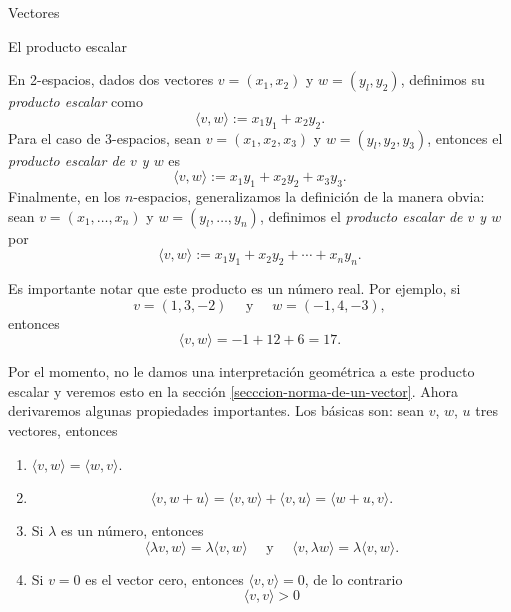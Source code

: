 \documentclass[a4paper,12pt,twoside,spanish]{amsbook}
\theoremstyle{definition}
\theoremstyle{remark}
\begin{document}
\begin{chapter}{Vectores}
	
	
	\begin{section}{El producto escalar}
		
		En 2-espacios, dados dos vectores $v = (x_1, x_2)$ y $w= (y_l, y_2)$, definimos su \textit{producto escalar} como
		\begin{equation*}
			\langle v , w  \rangle :=x_1y_1 + x_2y_2.
		\end{equation*}
		Para el caso de 3-espacios, sean   $v = (x_1, x_2,x_3)$ y $w= (y_l, y_2,y_3)$,  entonces el \textit{producto escalar de $v$ y $w$} es
		\begin{equation*}
			\langle v , w  \rangle :=x_1y_1 + x_2y_2+x_3y_3.
		\end{equation*}
		Finalmente, en los $n$-espacios,  generalizamos la definición de la manera obvia: sean  $v = (x_1, \ldots,x_n)$ y $w= (y_l, \ldots,y_n)$,  definimos el \textit{producto escalar de $v$ y $w$} por		
		\begin{equation*}
		\langle v , w \rangle :=x_1y_1 + x_2y_2+\cdots+x_ny_n.
		\end{equation*}
		
		Es importante notar  que este producto es un número real. Por ejemplo, si
		\begin{equation*}
			v= (1, 3, - 2) \quad\text{ y } \quad w= (- 1, 4, - 3),
		\end{equation*}
		entonces
		\begin{equation*}
			\langle v , w \rangle= - 1 + 12 + 6 = 17.
		\end{equation*}
		
		Por el momento, no le damos una interpretación geométrica a este producto escalar y veremos esto en la sección \ref{secccion-norma-de-un-vector}. Ahora derivaremos algunas propiedades importantes. Los básicas son: sean $v$, $w$, $u$  tres vectores, entonces
		
		
		\begin{enumerate}[label=\textbf{P\arabic*.},ref=P\arabic*]
			\item\label{prop-P1}	$\langle v , w \rangle = \langle w , v \rangle$.
			\item\label{prop-P2} 
			\begin{equation*}
				\langle v , w + u \rangle =\langle v , w \rangle + \langle v , u \rangle = \langle w +u , v \rangle.
			\end{equation*}
			\item\label{prop-P3} Si $\lambda$ es un número, entonces 
			\begin{equation*}
				\langle \lambda v , w \rangle = \lambda \langle v , w \rangle \quad \text{ y } \quad  \langle v , \lambda w \rangle = \lambda \langle v , w \rangle.
			\end{equation*}
			\item\label{prop-P4} Si $v=0$ es el vector cero, entonces $\langle v , v \rangle =0$,  de lo contrario
			\begin{equation*}
				\langle v , v \rangle >0
			\end{equation*}
		\end{enumerate}
		

\end{section}
\end{chapter}
\end{document}
